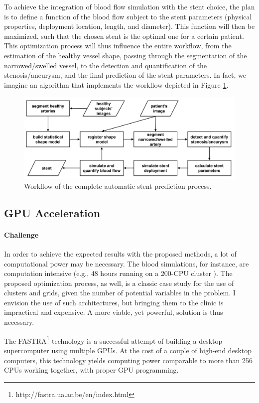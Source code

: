 \documentclass[a4paper]{article}
\newcommand{\challenge}{\paragraph{Challenge}}
\newcommand{\citep}{\cite}
\begin{document}
To achieve the integration of blood flow simulation with the stent choice, the plan is to define a function of the blood flow subject to the stent parameters (physical properties, deployment location, length, and diameter). This function will then be maximized, such that the chosen stent is the optimal one for a certain patient. This optimization process will thus influence the entire workflow, from the estimation of the healthy vessel shape, passing through the segmentation of the narrowed/swelled vessel, to the detection and quantification of the stenosis/aneurysm, and the final prediction of the stent parameters. In fact, we imagine an algorithm that implements the workflow depicted in Figure \ref{fig:workflow}. 

\begin{figure}%
\centering
\includegraphics[width=0.8\columnwidth]{workflow.png}%
\caption{Workflow of the complete automatic stent prediction process.}%
\label{fig:workflow}%
\end{figure}

\subsection{GPU Acceleration}

\challenge
In order to achieve the expected results with the proposed methods, a lot of computational power may be necessary. The blood simulations, for instance, are computation intensive (e.g., 48 hours running on a 200-CPU cluster \citep{deBeule}). The proposed optimization process, as well, is a classic case study for the use of clusters and grids, given the number of potential variables in the problem. I envision the use of such architectures, but bringing them to the clinic is impractical and expensive. A more viable, yet powerful, solution is thus necessary.

The FASTRA\footnote{http://fastra.ua.ac.be/en/index.html} technology is a successful attempt of building a desktop supercomputer using multiple GPUs. At the cost of a couple of high-end desktop computers, this technology yields computing power comparable to more than 256 CPUs working together, with proper GPU programming.
\end{document}

